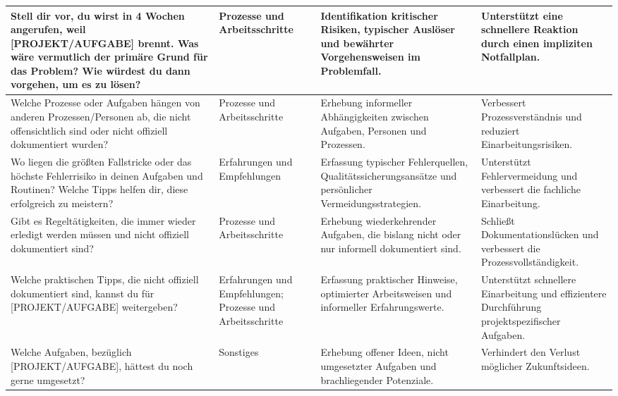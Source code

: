 \documentclass[
  10pt,
  ngerman,
  a4paper,
  toc=graduated,
  numbers=noenddot,
  headings=standardclasses,
  nonumberlist
]{scrartcl}
\begin{document}
\begin{longtable}{|L{4.9cm}|L{3.1cm}|L{3.8cm}|L{3.3cm}|}
Stell dir vor, du wirst in 4 Wochen angerufen, weil [PROJEKT/AUFGABE] brennt. Was wäre vermutlich der primäre Grund für das Problem? Wie würdest du dann vorgehen, um es zu lösen?
& Prozesse und Arbeitsschritte
& Identifikation kritischer Risiken, typischer Auslöser und bewährter Vorgehensweisen im Problemfall.
& Unterstützt eine schnellere Reaktion durch einen impliziten Notfallplan. \\
\hline

Welche Prozesse oder Aufgaben hängen von anderen Prozessen/Personen ab, die nicht offensichtlich sind oder nicht offiziell dokumentiert wurden?
& Prozesse und Arbeitsschritte
& Erhebung informeller Abhängigkeiten zwischen Aufgaben, Personen und Prozessen.
& Verbessert Prozessverständnis und reduziert Einarbeitungsrisiken. \\
\hline

Wo liegen die größten Fallstricke oder das höchste Fehlerrisiko in deinen Aufgaben und Routinen? Welche Tipps helfen dir, diese erfolgreich zu meistern?
& Erfahrungen und Empfehlungen
& Erfassung typischer Fehlerquellen, Qualitätssicherungsansätze und persönlicher Vermeidungsstrategien.
& Unterstützt Fehlervermeidung und verbessert die fachliche Einarbeitung. \\
\hline

Gibt es Regeltätigkeiten, die immer wieder erledigt werden müssen und nicht offiziell dokumentiert sind?
& Prozesse und Arbeitsschritte
& Erhebung wiederkehrender Aufgaben, die bislang nicht oder nur informell dokumentiert sind.
& Schließt Dokumentationslücken und verbessert die Prozessvollständigkeit. \\
\hline

Welche praktischen Tipps, die nicht offiziell dokumentiert sind, kannst du für [PROJEKT/AUFGABE] 
weitergeben?
& Erfahrungen und Empfehlungen; Prozesse und Arbeitsschritte
& Erfassung praktischer Hinweise, optimierter Arbeitsweisen und informeller Erfahrungswerte.
& Unterstützt schnellere Einarbeitung und effizientere Durchführung projektspezifischer Aufgaben. \\
\hline

Welche Aufgaben, bezüglich [PROJEKT/AUFGABE], hättest du noch gerne umgesetzt?
& Sonstiges
& Erhebung offener Ideen, nicht umgesetzter Aufgaben und brachliegender Potenziale.
& Verhindert den Verlust möglicher Zukunftsideen. \\
\hline


\end{longtable}
\end{document}
